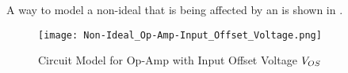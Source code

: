 A way to model a non-ideal  that is being affected by an  is shown in .

\begin{figure}[h!tbp]
  \centering
  \texttt{[image: Non-Ideal\_Op-Amp-Input\_Offset\_Voltage.png]}
  \caption{Circuit Model for Op-Amp with Input Offset Voltage $V_{OS}$ \parencite[p.~97]{sedraTextbook7}}
  \label{fig:Op-Amp_Input_Offset_Voltage}
\end{figure}


